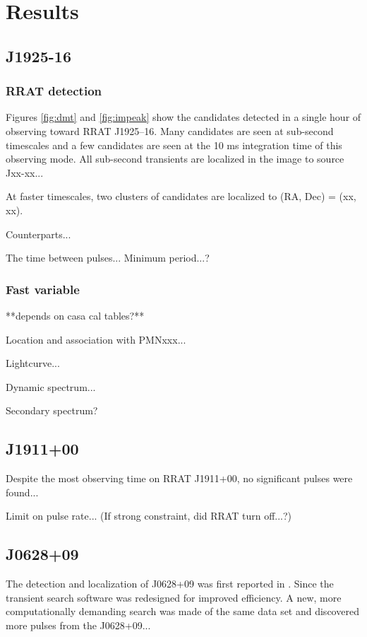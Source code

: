 \section{Results}

\subsection{J1925-16}
\subsubsection{RRAT detection}
\label{rrat1925}

Figures \ref{fig:dmt} and \ref{fig:impeak} show the candidates detected in a single hour of observing toward RRAT J1925--16. Many candidates are seen at sub-second timescales and a few candidates are seen at the 10 ms integration time of this observing mode. All sub-second transients are localized in the image to source Jxx-xx...

At faster timescales, two clusters of candidates are localized to (RA, Dec) = (xx, xx). 

Counterparts...

The time between pulses... Minimum period...?

\subsubsection{Fast variable}
\label{fast}

**depends on casa cal tables?**

Location and association with PMNxxx...

Lightcurve...

Dynamic spectrum...

Secondary spectrum?

\subsection{J1911+00}

Despite the most observing time on RRAT J1911+00, no significant pulses were found...

Limit on pulse rate...
(If strong constraint, did RRAT turn off...?)

\subsection{J0628+09}

The detection and localization of J0628+09 was first reported in \cite{Law_2012}. Since the transient search software was redesigned for improved efficiency. A new, more computationally demanding search was made of the same data set and discovered more pulses from the J0628+09...

